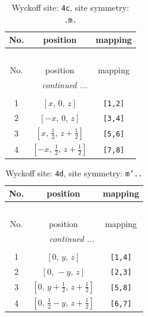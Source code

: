 \documentclass[fleqn,8pt]{jsarticle}
\begin{document}
\renewcommand{\arraystretch}{1.2}
\begin{longtable}{ccc}
\caption{Wyckoff site: {\tt 4c}, site symmetry: {\tt .m.}}
 \\
 \hline \hline
No. & position & mapping \\ \hline \endfirsthead

\multicolumn{2}{l}{\tablename\ \thetable{}} \\
 \hline \hline
No. & position & mapping \\ \hline \endhead

 \hline \hline
\multicolumn{2}{r}{\footnotesize\it continued ...} \\ \endfoot

 \hline \hline
\multicolumn{2}{r}{} \\ \endlastfoot

1 & $\left[ x,\, 0,\, z \right]$ & {\tt [1,2]} \\ \hline
2 & $\left[ - x,\, 0,\, z \right]$ & {\tt [3,4]} \\ \hline
3 & $\left[ x,\, \frac{1}{2},\, z + \frac{1}{2} \right]$ & {\tt [5,6]} \\ \hline
4 & $\left[ - x,\, \frac{1}{2},\, z + \frac{1}{2} \right]$ & {\tt [7,8]} \\
\end{longtable}
\renewcommand{\arraystretch}{1.2}
\begin{longtable}{ccc}
\caption{Wyckoff site: {\tt 4d}, site symmetry: {\tt m'..}}
 \\
 \hline \hline
No. & position & mapping \\ \hline \endfirsthead

\multicolumn{2}{l}{\tablename\ \thetable{}} \\
 \hline \hline
No. & position & mapping \\ \hline \endhead

 \hline \hline
\multicolumn{2}{r}{\footnotesize\it continued ...} \\ \endfoot

 \hline \hline
\multicolumn{2}{r}{} \\ \endlastfoot

1 & $\left[ 0,\, y,\, z \right]$ & {\tt [1,4]} \\ \hline
2 & $\left[ 0,\, - y,\, z \right]$ & {\tt [2,3]} \\ \hline
3 & $\left[ 0,\, y + \frac{1}{2},\, z + \frac{1}{2} \right]$ & {\tt [5,8]} \\ \hline
4 & $\left[ 0,\, \frac{1}{2} - y,\, z + \frac{1}{2} \right]$ & {\tt [6,7]} \\
\end{longtable}
\end{document}
